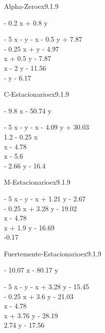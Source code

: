 \begin{bilevelmodel}{Alpha-Zero}{ex9.1.9}
    \begin{upperlevel}{- 0.2 x + 0.8 y}{
        
    }
    \end{upperlevel}
    \begin{lowerlevel}{- 5 x - y}{
         - x - 0.5 y + 7.87  \\ 
 - 0.25 x + y - 4.97  \\ 
 x + 0.5 y - 7.87  \\ 
 x - 2 y - 11.56  \\ 
 - y - 6.17 
    }
    \end{lowerlevel}
\end{bilevelmodel}
    

\begin{bilevelmodel}{C-Estacionario}{ex9.1.9}
    \begin{upperlevel}{- 9.8 x - 50.74 y}{
        
    }
    \end{upperlevel}
    \begin{lowerlevel}{- 5 x - y}{
         - x - 4.09 y + 30.03  \\ 
 1.2 - 0.25 x  \\ 
 x - 4.78  \\ 
 x - 5.6  \\ 
 - 2.66 y - 16.4 
    }
    \end{lowerlevel}
\end{bilevelmodel}
    
        

\begin{bilevelmodel}{M-Estacionario}{ex9.1.9}
    \begin{upperlevel}{0}{
        
    }
    \end{upperlevel}
    \begin{lowerlevel}{- 5 x - y}{
         - x + 1.21 y - 2.67  \\ 
 - 0.25 x + 3.28 y - 19.02  \\ 
 x - 4.78  \\ 
 x + 1.9 y - 16.69  \\ 
 -0.17 
    }
    \end{lowerlevel}
\end{bilevelmodel}
    

\begin{bilevelmodel}{Fuertemente-Estacionario}{ex9.1.9}
    \begin{upperlevel}{- 10.07 x - 80.17 y}{
        
    }
    \end{upperlevel}
    \begin{lowerlevel}{- 5 x - y}{
         - x + 3.28 y - 15.45  \\ 
 - 0.25 x + 3.6 y - 21.03  \\ 
 x - 4.78  \\ 
 x + 3.76 y - 28.19  \\ 
 2.74 y - 17.56 
    }
    \end{lowerlevel}
\end{bilevelmodel}
    
        
